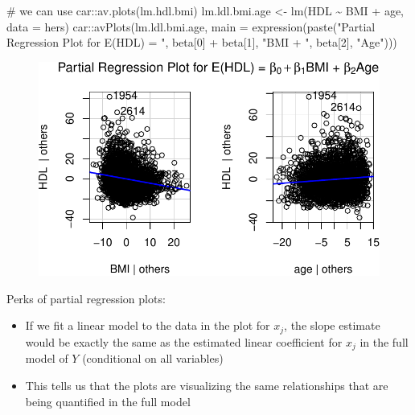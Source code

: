 \documentclass[
  letterpaper,
  DIV=11,
  numbers=noendperiod]{scrreport}
\newenvironment{Shaded}{\begin{snugshade}}{\end{snugshade}}
\newcommand{\AttributeTok}[1]{\textcolor[rgb]{0.40,0.45,0.13}{#1}}
\newcommand{\CommentTok}[1]{\textcolor[rgb]{0.37,0.37,0.37}{#1}}
\newcommand{\DecValTok}[1]{\textcolor[rgb]{0.68,0.00,0.00}{#1}}
\newcommand{\FunctionTok}[1]{\textcolor[rgb]{0.28,0.35,0.67}{#1}}
\newcommand{\NormalTok}[1]{\textcolor[rgb]{0.00,0.23,0.31}{#1}}
\newcommand{\OtherTok}[1]{\textcolor[rgb]{0.00,0.23,0.31}{#1}}
\newcommand{\SpecialCharTok}[1]{\textcolor[rgb]{0.37,0.37,0.37}{#1}}
\newcommand{\StringTok}[1]{\textcolor[rgb]{0.13,0.47,0.30}{#1}}
\providecommand{\tightlist}{%
  \setlength{\itemsep}{0pt}\setlength{\parskip}{0pt}}\usepackage{longtable,booktabs,array}
\begin{document}
\begin{Shaded}
\begin{Highlighting}[]
\CommentTok{\# we can use car::av.plots(lm.hdl.bmi)}
\NormalTok{lm.ldl.bmi.age }\OtherTok{\textless{}{-}} \FunctionTok{lm}\NormalTok{(HDL }\SpecialCharTok{\textasciitilde{}}\NormalTok{ BMI }\SpecialCharTok{+}\NormalTok{ age, }\AttributeTok{data =}\NormalTok{ hers)}
\NormalTok{car}\SpecialCharTok{::}\FunctionTok{avPlots}\NormalTok{(lm.ldl.bmi.age, }\AttributeTok{main =} \FunctionTok{expression}\NormalTok{(}\FunctionTok{paste}\NormalTok{(}\StringTok{"Partial Regression Plot for E(HDL) = "}\NormalTok{, beta[}\DecValTok{0}\NormalTok{] }\SpecialCharTok{+}\NormalTok{ beta[}\DecValTok{1}\NormalTok{], }\StringTok{"BMI + "}\NormalTok{, beta[}\DecValTok{2}\NormalTok{], }\StringTok{"Age"}\NormalTok{)))}
\end{Highlighting}
\end{Shaded}

\begin{figure}[H]

{\centering \includegraphics{week4/week4_files/figure-pdf/unnamed-chunk-9-1.pdf}

}

\end{figure}

Perks of partial regression plots:

\begin{itemize}
\tightlist
\item
  If we fit a linear model to the data in the plot for \(x_j\), the
  slope estimate would be exactly the same as the estimated linear
  coefficient for \(x_j\) in the full model of \(Y\) (conditional on all
  variables)
\item
  This tells us that the plots are visualizing the same relationships
  that are being quantified in the full model
\end{itemize}
\end{document}
